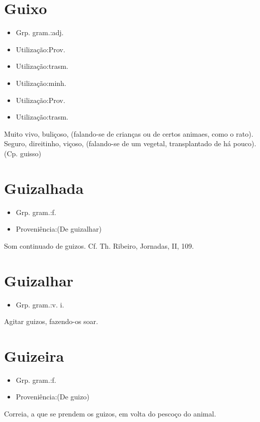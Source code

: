 \section{Guixo}
\begin{itemize}
\item {Grp. gram.:adj.}
\end{itemize}
\begin{itemize}
\item {Utilização:Prov.}
\end{itemize}
\begin{itemize}
\item {Utilização:trasm.}
\end{itemize}
\begin{itemize}
\item {Utilização:minh.}
\end{itemize}
\begin{itemize}
\item {Utilização:Prov.}
\end{itemize}
\begin{itemize}
\item {Utilização:trasm.}
\end{itemize}
Muito vivo, buliçoso, (falando-se de crianças ou de certos animaes, como o rato).
Seguro, direitinho, viçoso, (falando-se de um vegetal, transplantado de há pouco).
(Cp. \textunderscore guisso\textunderscore )
\section{Guizalhada}
\begin{itemize}
\item {Grp. gram.:f.}
\end{itemize}
\begin{itemize}
\item {Proveniência:(De \textunderscore guizalhar\textunderscore )}
\end{itemize}
Som continuado de guizos. Cf. Th. Ribeiro, \textunderscore Jornadas\textunderscore , II, 109.
\section{Guizalhar}
\begin{itemize}
\item {Grp. gram.:v. i.}
\end{itemize}
Agitar guizos, fazendo-os soar.
\section{Guizeira}
\begin{itemize}
\item {Grp. gram.:f.}
\end{itemize}
\begin{itemize}
\item {Proveniência:(De \textunderscore guizo\textunderscore )}
\end{itemize}
Correia, a que se prendem os guizos, em volta do pescoço do animal.
